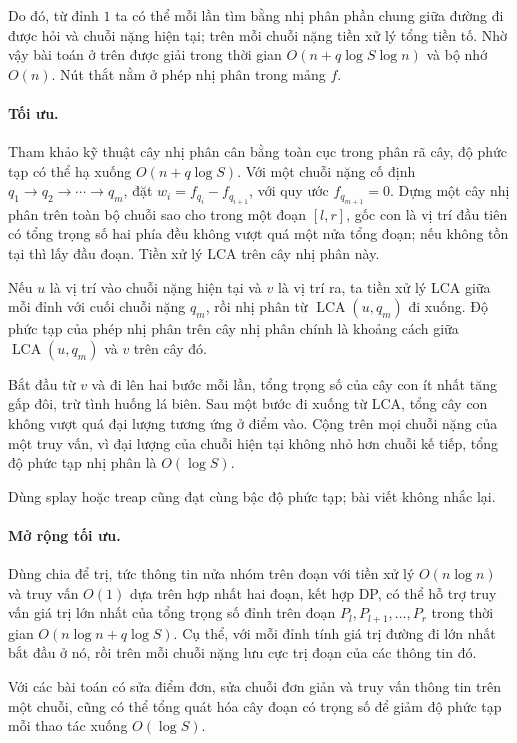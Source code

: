 \documentclass[11pt]{article}
\begin{document}
Do đó, từ đỉnh $1$ ta có thể mỗi lần tìm bằng nhị phân phần chung giữa đường đi
được hỏi và chuỗi nặng hiện tại; trên mỗi chuỗi nặng tiền xử lý tổng tiền tố.
Nhờ vậy bài toán ở trên được giải trong thời gian $O(n+q\log S\log n)$ và bộ nhớ
$O(n)$. Nút thắt nằm ở phép nhị phân trong mảng $f$.

\paragraph{Tối ưu.}
Tham khảo kỹ thuật cây nhị phân cân bằng toàn cục trong phân rã cây, độ phức tạp
có thể hạ xuống $O(n+q\log S)$. Với một chuỗi nặng cố định
\(q_1\to q_2\to\cdots\to q_m\), đặt
\(w_i=f_{q_i}-f_{q_{i+1}}\), với quy ước \(f_{q_{m+1}}=0\).
Dựng một cây nhị phân trên toàn bộ chuỗi sao cho trong một đoạn $[l,r]$, gốc con
là vị trí đầu tiên có tổng trọng số hai phía đều không vượt quá một nửa tổng
đoạn; nếu không tồn tại thì lấy đầu đoạn. Tiền xử lý LCA trên cây nhị phân này.

Nếu $u$ là vị trí vào chuỗi nặng hiện tại và $v$ là vị trí ra, ta tiền xử lý LCA
giữa mỗi đỉnh với cuối chuỗi nặng \(q_m\), rồi nhị phân từ
\(\operatorname{LCA}(u,q_m)\) đi xuống. Độ phức tạp của phép nhị phân trên cây
nhị phân chính là khoảng cách giữa \(\operatorname{LCA}(u,q_m)\) và \(v\) trên
cây đó.

Bắt đầu từ $v$ và đi lên hai bước mỗi lần, tổng trọng số của cây con ít nhất
tăng gấp đôi, trừ tình huống lá biên. Sau một bước đi xuống từ LCA, tổng cây con
không vượt quá đại lượng tương ứng ở điểm vào. Cộng trên mọi chuỗi nặng của một
truy vấn, vì đại lượng của chuỗi hiện tại không nhỏ hơn chuỗi kế tiếp, tổng độ
phức tạp nhị phân là $O(\log S)$.

Dùng splay hoặc treap cũng đạt cùng bậc độ phức tạp; bài viết không nhắc lại.

\paragraph{Mở rộng tối ưu.}
Dùng chia để trị, tức thông tin nửa nhóm trên đoạn với tiền xử lý
$O(n\log n)$ và truy vấn $O(1)$ dựa trên hợp nhất hai đoạn, kết hợp DP, có thể
hỗ trợ truy vấn giá trị lớn nhất của tổng trọng số đỉnh trên đoạn
$P_l,P_{l+1},\ldots,P_r$ trong thời gian $O(n\log n+q\log S)$. Cụ thể, với mỗi
đỉnh tính giá trị đường đi lớn nhất bắt đầu ở nó, rồi trên mỗi chuỗi nặng lưu cực
trị đoạn của các thông tin đó.

Với các bài toán có sửa điểm đơn, sửa chuỗi đơn giản và truy vấn thông tin trên
một chuỗi, cũng có thể tổng quát hóa cây đoạn có trọng số để giảm độ phức tạp
mỗi thao tác xuống $O(\log S)$.
\end{document}
